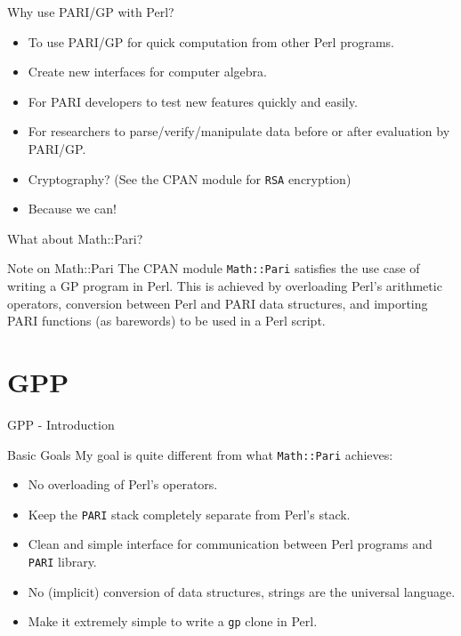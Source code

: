 \documentclass{beamer}
\begin{document}
\begin{frame}{Why use PARI/GP with Perl?}

\begin{itemize}
	\item To use PARI/GP for quick computation from other Perl programs.
    \item Create new interfaces for computer algebra.
    \item For PARI developers to test new features quickly and easily.
    \item For researchers to parse/verify/manipulate data before or after evaluation by PARI/GP.
    \item Cryptography? (See the CPAN module for \texttt{RSA} encryption)
	\item Because we can!
\end{itemize}

\end{frame}

\begin{frame}{What about Math::Pari?}

\begin{block}{Note on Math::Pari}
The CPAN module \texttt{Math::Pari} satisfies the use case of writing a GP program in Perl. This is achieved by overloading Perl's arithmetic operators, conversion between Perl and PARI data structures, and importing PARI functions (as barewords) to be used in a Perl script. 
\end{block}

\end{frame}

\section{GPP}

\begin{frame}{GPP - Introduction}

\begin{block}{Basic Goals}
My goal is quite different from what \texttt{Math::Pari} achieves:
\end{block}

\begin{itemize}
	\item No overloading of Perl's operators.
    \item Keep the \texttt{PARI} stack completely separate from Perl's stack.
    \item Clean and simple interface for communication between Perl programs and \texttt{PARI} library.
    \item No (implicit) conversion of data structures, strings are the universal language.
    \item Make it extremely simple to write a \texttt{gp} clone in Perl.
\end{itemize}

\end{frame}
\end{document}
